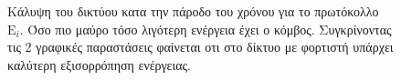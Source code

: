 \begin{figure}[H]
  \centering
  \caption{Κάλυψη του δικτύου κατα την πάροδο του χρόνου για το πρωτόκολλο $\text{E}_{i}$. Όσο πιο μαύρο τόσο λιγότερη ενέργεια έχει ο κόμβος. Συγκρίνοντας τις 2
γραφικές παραστάσεις φαίνεται οτι στο δίκτυο με φορτιστή υπάρχει καλύτερη εξισορρόπηση ενέργειας.}
  \label{fig:5_1exp_4_3}
\end{figure}



